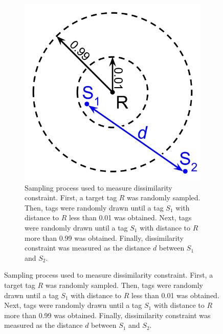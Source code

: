 \begin{figure}[!htbp]

\begin{center}
\begin{subfigure}[b]{\linewidth}
\begin{minipage}{0.5\linewidth}

\includegraphics[width=0.75\linewidth]{img/elasticity-statistic}

\end{minipage}
\begin{minipage}{0.5\linewidth}
\caption{
Sampling process used to measure dissimilarity constraint.
First, a target tag $R$ was randomly sampled.
Then, tags were randomly drawn until a tag $S_1$ with distance to $R$ less than 0.01 was obtained.
Next, tags were randomly drawn until a tag $S_1$ with distance to $R$ more than 0.99 was obtained.
Finally, dissimilarity constraint was measured as the distance $d$ between $S_1$ and $S_2$.
}
\label{fig:dissimilarity_statistic}
\end{minipage}

\end{subfigure}


\end{center}
\end{figure}
